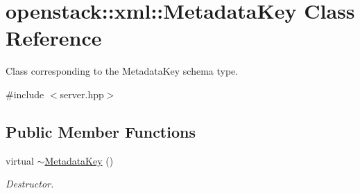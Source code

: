 \hypertarget{classopenstack_1_1xml_1_1MetadataKey}{
\section{openstack::xml::MetadataKey Class Reference}
\label{classopenstack_1_1xml_1_1MetadataKey}
}


Class corresponding to the MetadataKey schema type.  




{\ttfamily \#include $<$server.hpp$>$}

\subsection*{Public Member Functions}
\begin{DoxyCompactItemize}
\item 
\hypertarget{classopenstack_1_1xml_1_1MetadataKey_a38b6b79cafa08945a88f11a0e7e75b6c}{
virtual \hyperlink{classopenstack_1_1xml_1_1MetadataKey_a38b6b79cafa08945a88f11a0e7e75b6c}{$\sim$MetadataKey} ()}
\label{classopenstack_1_1xml_1_1MetadataKey_a38b6b79cafa08945a88f11a0e7e75b6c}

\begin{DoxyCompactList}\small\item\em Destructor. \item\end{DoxyCompactList}\end{DoxyCompactItemize}
